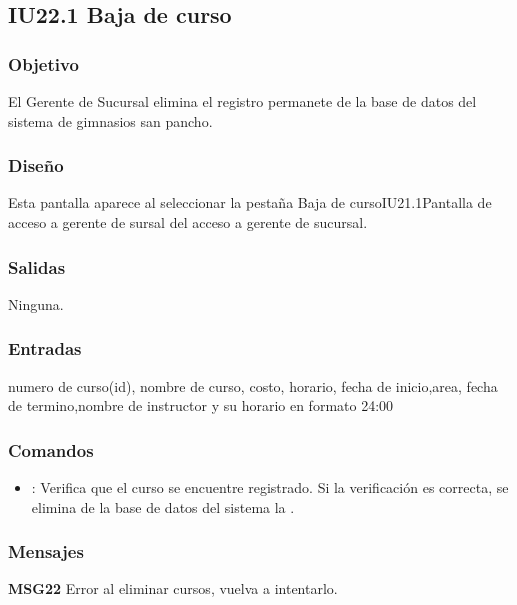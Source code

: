 \subsection{IU22.1 Baja de curso}


\subsubsection{Objetivo}
	El Gerente de Sucursal elimina el registro permanete de la base de datos del sistema de gimnasios san pancho.
 
\subsubsection{Diseño}
	Esta pantalla aparece al seleccionar la pestaña Baja de curso{IU21.1}{Pantalla de acceso a gerente de sursal} del acceso a gerente de sucursal. 


\subsubsection{Salidas}

	Ninguna.

\subsubsection{Entradas}
numero de curso(id), nombre de curso, costo, horario, fecha de inicio,area, fecha de termino,nombre de instructor y su  horario en formato 24:00

\subsubsection{Comandos}
\begin{itemize}
	\item {}: Verifica que el curso se encuentre registrado. Si la verificación es correcta, se elimina de la base de datos del sistema la .
\end{itemize}

\subsubsection{Mensajes}
	\begin{Citemize}
		\item {\bf MSG22} Error al eliminar cursos, vuelva a intentarlo.
	\end{Citemize}
	